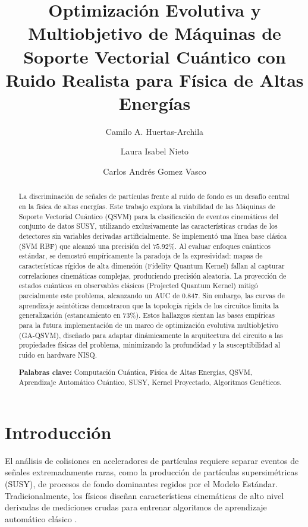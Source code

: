 \documentclass[11pt,a4paper]{article}
\title{\vspace{-2cm}\Large\bfseries Optimización Evolutiva y Multiobjetivo de Máquinas de Soporte Vectorial Cuántico con Ruido Realista para Física de Altas Energías}
\author[1]{Camilo A. Huertas-Archila}
\author[1]{Laura Isabel Nieto}
\author[1]{Carlos Andrés Gomez Vasco}
\affil[1]{\small Programa Académico de Física, Universidad Distrital Francisco José de Caldas, Bogotá, Colombia.}
\date{}
\begin{document}
\maketitle
\thispagestyle{empty} 

\vspace{-1cm}
\begin{abstract}
\noindent
La discriminación de señales de partículas frente al ruido de fondo es un desafío central en la física de altas energías. Este trabajo explora la viabilidad de las Máquinas de Soporte Vectorial Cuántico (QSVM) para la clasificación de eventos cinemáticos del conjunto de datos SUSY, utilizando exclusivamente las características crudas de los detectores sin variables derivadas artificialmente. Se implementó una línea base clásica (SVM RBF) que alcanzó una precisión del $75.92\%$. Al evaluar enfoques cuánticos estándar, se demostró empíricamente la paradoja de la expresividad: mapas de características rígidos de alta dimensión (Fidelity Quantum Kernel) fallan al capturar correlaciones cinemáticas complejas, produciendo precisión aleatoria. La proyección de estados cuánticos en observables clásicos (Projected Quantum Kernel) mitigó parcialmente este problema, alcanzando un AUC de $0.847$. Sin embargo, las curvas de aprendizaje asintóticas demostraron que la topología rígida de los circuitos limita la generalización (estancamiento en $73\%$). Estos hallazgos sientan las bases empíricas para la futura implementación de un marco de optimización evolutiva multiobjetivo (GA-QSVM), diseñado para adaptar dinámicamente la arquitectura del circuito a las propiedades físicas del problema, minimizando la profundidad y la susceptibilidad al ruido en hardware NISQ.

\vspace{0.5cm}
\noindent \textbf{Palabras clave:} Computación Cuántica, Física de Altas Energías, QSVM, Aprendizaje Automático Cuántico, SUSY, Kernel Proyectado, Algoritmos Genéticos.
\end{abstract}

\vspace{0.5cm}

\section{Introducción}
El análisis de colisiones en aceleradores de partículas requiere separar eventos de señales extremadamente raras, como la producción de partículas supersimétricas (SUSY), de procesos de fondo dominantes regidos por el Modelo Estándar. Tradicionalmente, los físicos diseñan características cinemáticas de alto nivel derivadas de mediciones crudas para entrenar algoritmos de aprendizaje automático clásico \cite{baldi2014}. 
\end{document}
